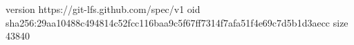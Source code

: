 version https://git-lfs.github.com/spec/v1
oid sha256:29aa10488c494814c52fcc116baa9c5f67ff7314f7afa51f4e69c7d5b1d3aecc
size 43840
